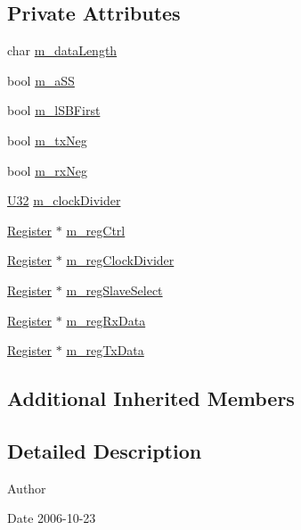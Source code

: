 \subsection*{Private Attributes}
\begin{DoxyCompactItemize}
\item 
char \hyperlink{classUsbSpiBus_a2d8b2bddd6d4d5dc53c38b5698737c5c}{m\+\_\+data\+Length}
\item 
bool \hyperlink{classUsbSpiBus_ac98d088ac8aed042f65cbd918fc538ae}{m\+\_\+a\+SS}
\item 
bool \hyperlink{classUsbSpiBus_a23011787b0425356b011bc7a1c7cff5b}{m\+\_\+l\+S\+B\+First}
\item 
bool \hyperlink{classUsbSpiBus_a48528e7dcb036ecc1732581a89e16d10}{m\+\_\+tx\+Neg}
\item 
bool \hyperlink{classUsbSpiBus_abf36f2df24c3ec5363efe73c9771bbc8}{m\+\_\+rx\+Neg}
\item 
\hyperlink{classUsbSpiBus_a9b24e28662a35ca57f5ed32c41c5f3ff}{U32} \hyperlink{classUsbSpiBus_a5a4de2b61018f52b885559ce07bd3161}{m\+\_\+clock\+Divider}
\item 
\hyperlink{classRegister}{Register} $\ast$ \hyperlink{classUsbSpiBus_abcd2ac59f2bb4ea5b97ff98f2b7659da}{m\+\_\+reg\+Ctrl}
\item 
\hyperlink{classRegister}{Register} $\ast$ \hyperlink{classUsbSpiBus_abfd5f040a0a8c19d972b26ea581bf1f0}{m\+\_\+reg\+Clock\+Divider}
\item 
\hyperlink{classRegister}{Register} $\ast$ \hyperlink{classUsbSpiBus_a5cdebdc06a79322c0802fbc523cade91}{m\+\_\+reg\+Slave\+Select}
\item 
\hyperlink{classRegister}{Register} $\ast$ \hyperlink{classUsbSpiBus_ab59fb8ae67f97818d8cc6e0daf324cf6}{m\+\_\+reg\+Rx\+Data}
\item 
\hyperlink{classRegister}{Register} $\ast$ \hyperlink{classUsbSpiBus_ae4b9ec4d035b9a507735b28dba04556c}{m\+\_\+reg\+Tx\+Data}
\end{DoxyCompactItemize}
\subsection*{Additional Inherited Members}


\subsection{Detailed Description}
\begin{DoxyAuthor}{Author}

\end{DoxyAuthor}
\begin{DoxyDate}{Date}
2006-\/10-\/23 
\end{DoxyDate}


